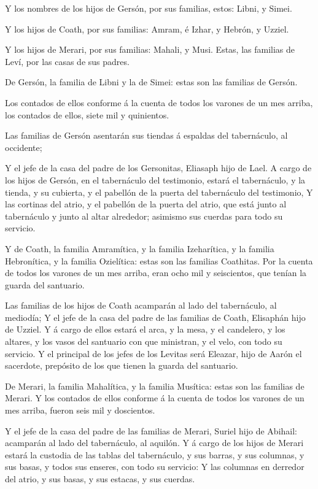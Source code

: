  Y los nombres de los hijos de Gersón, por sus familias,
estos: Libni, y Simei.

 Y los hijos de Coath, por sus familias: Amram, é Izhar, y
Hebrón, y Uzziel.

 Y los hijos de Merari, por sus familias: Mahali, y Musi.
Estas, las familias de Leví, por las casas de sus padres.

 De Gersón, la familia de Libni y la de Simei: estas son
las familias de Gersón.

 Los contados de ellos conforme á la cuenta de todos los
varones de un mes arriba, los contados de ellos, siete mil y quinientos.

 Las familias de Gersón asentarán sus tiendas á espaldas
del tabernáculo, al occidente;

 Y el jefe de la casa del padre de los Gersonitas, Eliasaph
hijo de Lael.  A cargo de los hijos de Gersón, en el
tabernáculo del testimonio, estará el tabernáculo, y la tienda, y su
cubierta, y el pabellón de la puerta del tabernáculo del testimonio,
 Y las cortinas del atrio, y el pabellón de la puerta del
atrio, que está junto al tabernáculo y junto al altar alrededor;
asimismo sus cuerdas para todo su servicio.

 Y de Coath, la familia Amramítica, y la familia
Izeharítica, y la familia Hebronítica, y la familia Ozielítica: estas
son las familias Coathitas.  Por la cuenta de todos los
varones de un mes arriba, eran ocho mil y seiscientos, que tenían la
guarda del santuario.

 Las familias de los hijos de Coath acamparán al lado del
tabernáculo, al mediodía;  Y el jefe de la casa del padre
de las familias de Coath, Elisaphán hijo de Uzziel.  Y á
cargo de ellos estará el arca, y la mesa, y el candelero, y los altares,
y los vasos del santuario con que ministran, y el velo, con todo su
servicio.  Y el principal de los jefes de los Levitas será
Eleazar, hijo de Aarón el sacerdote, prepósito de los que tienen la
guarda del santuario.

 De Merari, la familia Mahalítica, y la familia Musítica:
estas son las familias de Merari.  Y los contados de ellos
conforme á la cuenta de todos los varones de un mes arriba, fueron seis
mil y doscientos.

 Y el jefe de la casa del padre de las familias de Merari,
Suriel hijo de Abihail: acamparán al lado del tabernáculo, al aquilón.
 Y á cargo de los hijos de Merari estará la custodia de las
tablas del tabernáculo, y sus barras, y sus columnas, y sus basas, y
todos sus enseres, con todo su servicio:  Y las columnas en
derredor del atrio, y sus basas, y sus estacas, y sus cuerdas.

